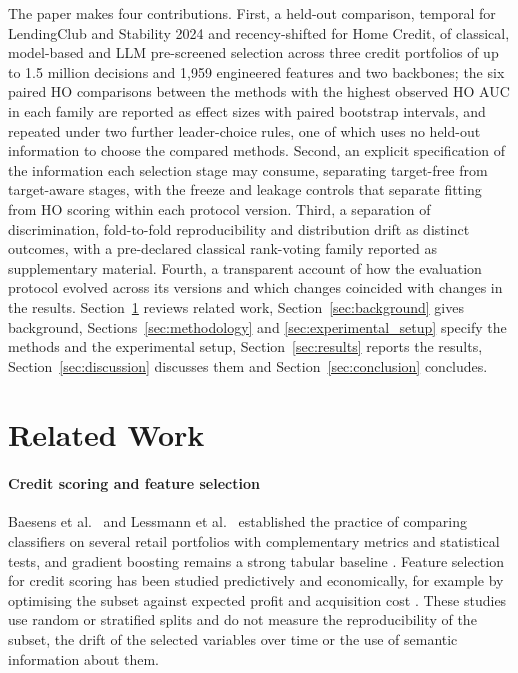 \documentclass[final,5p,twocolumn]{elsarticle}
\begin{document}
The paper makes four contributions. First, a held-out comparison, temporal for LendingClub and Stability 2024 and recency-shifted for Home Credit, of classical, model-based and LLM pre-screened selection across three credit portfolios of up to 1.5 million decisions and 1,959 engineered features and two backbones; the six paired HO comparisons between the methods with the highest observed HO AUC in each family are reported as effect sizes with paired bootstrap intervals, and repeated under two further leader-choice rules, one of which uses no held-out information to choose the compared methods. Second, an explicit specification of the information each selection stage may consume, separating target-free from target-aware stages, with the freeze and leakage controls that separate fitting from HO scoring within each protocol version. Third, a separation of discrimination, fold-to-fold reproducibility and distribution drift as distinct outcomes, with a pre-declared classical rank-voting family reported as supplementary material. Fourth, a transparent account of how the evaluation protocol evolved across its versions and which changes coincided with changes in the results. Section~\ref{sec:related_work} reviews related work, Section~\ref{sec:background} gives background, Sections~\ref{sec:methodology} and \ref{sec:experimental_setup} specify the methods and the experimental setup, Section~\ref{sec:results} reports the results, Section~\ref{sec:discussion} discusses them and Section~\ref{sec:conclusion} concludes.


\section{Related Work}
\label{sec:related_work}

\paragraph{Credit scoring and feature selection}
Baesens et al.\ \cite{baesens2003} and Lessmann et al.\ \cite{lessmann2015} established the practice of comparing classifiers on several retail portfolios with complementary metrics and statistical tests, and gradient boosting remains a strong tabular baseline \cite{gunnarsson2021}. Feature selection for credit scoring has been studied predictively and economically, for example by optimising the subset against expected profit and acquisition cost \cite{maldonado2017}. These studies use random or stratified splits and do not measure the reproducibility of the subset, the drift of the selected variables over time or the use of semantic information about them.
\end{document}
